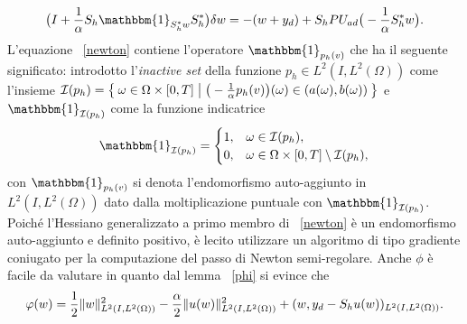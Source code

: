 \begin{equation}
\label{newton}
\big( I + \frac{1}{\alpha}S_h\mathbbm{1}_{S^*_hw}S^*_h\big)\delta w=-(w+y_d)+S_hP{U_{ad}}\big( -\frac{1}{\alpha}S^*_hw\big).
\end{equation}
L'equazione ~\eqref{newton} contiene l'operatore $ \mathbbm{1}_{p_h(v)} $ che ha il seguente significato: introdotto l'\textit{inactive set} della funzione $ p_h\in L^2(I,L^2(\Omega)) $ come l'insieme $ \mathcal{I}(p_h)=\Set{\omega\in \Omega\times [0,T] | \big( -\frac{1}{\alpha}p_h(v)\big)(\omega)\in (a(\omega),b(\omega))} $ e $ \mathbbm{1}_{\mathcal{I}(p_h)} $ come la funzione indicatrice 
\begin{equation}
\mathbbm{1}_{\mathcal{I}(p_h)}=
\begin{cases}
1,          &\omega\in\mathcal{I}(p_h), \\
0,          &\omega\in\Omega\times [0,T]\setminus\mathcal{I}(p_h),
\end{cases}
\end{equation}
con $ \mathbbm{1}_{p_h(v)} $ si denota l'endomorfismo auto-aggiunto in $ L^2(I,L^2(\Omega)) $ dato dalla moltiplicazione puntuale con $ \mathbbm{1}_{\mathcal{I}(p_h)} $. Poiché l'Hessiano generalizzato a primo membro di ~\eqref{newton} è un endomorfismo auto-aggiunto e definito positivo, è lecito utilizzare un algoritmo di tipo gradiente coniugato per la computazione del passo di Newton semi-regolare. Anche $ \phi $ è facile da valutare in quanto dal lemma ~\eqref{phi} si evince che 
\begin{equation}
\varphi(w)=\frac{1}{2}\lVert w\rVert^2_{L^2(I,L^2(\Omega))} - \frac{\alpha}{2}\lVert u(w)\rVert^2_{L^2(I,L^2(\Omega))} + (w,y_d-S_hu(w))_{L^2(I,L^2(\Omega))}.
\end{equation}


